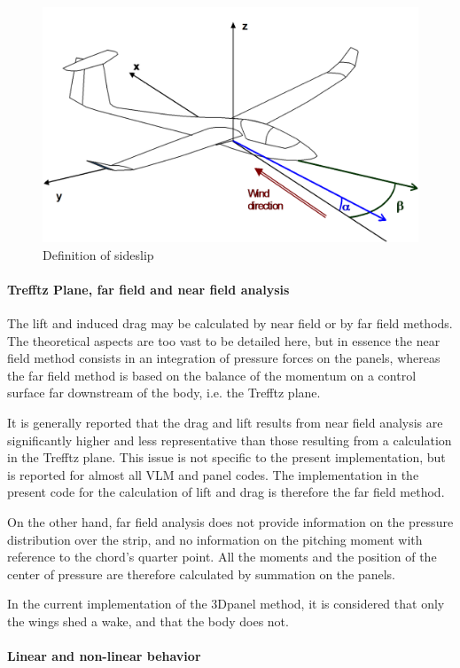 \documentclass[a4paper,twoside,12pt,dvips]{article}
\begin{document}
\begin{figure}[htbp]
  \includegraphics[width=0.8\linewidth]{img-27}\centering 
  \caption{Definition of sideslip}
  \label{fig:definition_of_sideslip}
\end{figure}

\paragraph{Trefftz Plane, far field and near field analysis}

The lift and induced drag may be calculated by near field or by far
field methods. The theoretical aspects are too vast to be detailed
here, but in essence the near field method consists in an integration
of pressure forces on the panels, whereas the far field method is
based on the balance of the momentum on a control surface far
downstream of the body, i.e. the Trefftz plane.

It is generally reported that the drag and lift results from near
field analysis are significantly higher and less representative than
those resulting from a calculation in the Trefftz plane. This issue is
not specific to the present implementation, but is reported for almost
all VLM and panel codes. The implementation in the present code for
the calculation of lift and drag is therefore the far field method.

On the other hand, far field analysis does not provide information on
the pressure distribution over the strip, and no information on the
pitching moment with reference to the chord's quarter point. All the
moments and the position of the center of pressure are therefore
calculated by summation on the panels.

In the current implementation of the 3Dpanel method, it is considered
that only the wings shed a wake, and that the body does not.

\paragraph{Linear and non-linear behavior}
\end{document}
